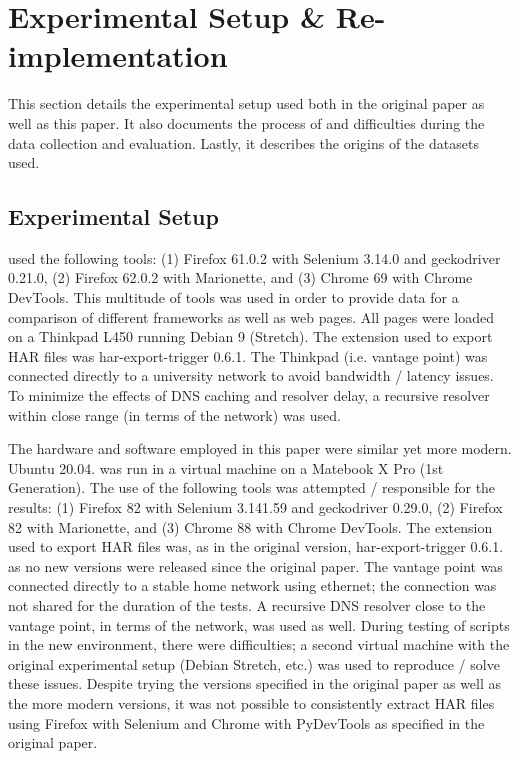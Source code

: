\section{Experimental Setup \& Re-implementation}
\label{sec:reimplement}
This section details the experimental setup used both in the original paper \cite{10.1007/978-3-030-15986-3_19} as well as this paper. It also documents the process of and difficulties during the data collection and evaluation. Lastly, it describes the origins of the datasets used.

\subsection{Experimental Setup}
\citeauthor{10.1007/978-3-030-15986-3_19} used the following tools: (1) Firefox 61.0.2 with Selenium 3.14.0 and geckodriver 0.21.0, (2) Firefox 62.0.2 with Marionette, and (3) Chrome 69 with Chrome DevTools. This multitude of tools was used in order to provide data for a comparison of different frameworks as well as web pages. All pages were loaded on a Thinkpad L450 running Debian 9 (Stretch). The extension used to export HAR files was har-export-trigger 0.6.1. The Thinkpad (i.e. vantage point) was connected directly to a university network to avoid bandwidth / latency issues. To minimize the effects of DNS caching and resolver delay, a recursive resolver within close range (in terms of the network) was used. 

The hardware and software employed in this paper were similar yet more modern. Ubuntu 20.04. was run in a virtual machine on a Matebook X Pro (1st Generation). The use of the following tools was attempted / responsible for the results: (1) Firefox 82 with Selenium 3.141.59 and geckodriver 0.29.0, (2) Firefox 82 with Marionette, and (3) Chrome 88 with Chrome DevTools. The extension used to export HAR files was, as in the original version, har-export-trigger 0.6.1. as no new versions were released since the original paper. The vantage point was connected directly to a stable home network using ethernet; the connection was not shared for the duration of the tests. A recursive DNS resolver close to the vantage point, in terms of the network, was used as well. During testing of scripts in the new environment, there were difficulties; a second virtual machine with the original experimental setup (Debian Stretch, etc.) was used to reproduce / solve these issues. Despite trying the versions specified in the original paper as well as the more modern versions, it was not possible to consistently extract HAR files using Firefox with Selenium and Chrome with PyDevTools as specified in the original paper. 

